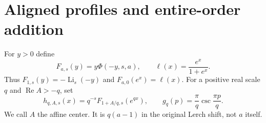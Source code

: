 \documentclass[11pt,a4paper]{article}
\numberwithin{equation}{section}
\theoremstyle{definition}\newtheorem{definition}[theorem]{Definition}
\theoremstyle{remark}\newtheorem{remark}[theorem]{Remark}
\DeclareMathOperator{\Li}{Li}
\DeclareMathOperator{\Rea}{Re}
\begin{document}
\section{Aligned profiles and entire-order addition}
\label{clc:sec:analysis}

For $y>0$ define
\begin{equation}\label{clc:eq:F}
 F_{a,s}(y)=y\Phi(-y,s,a),\qquad
 \ell(x)=\frac{e^x}{1+e^x}.
\end{equation}
Thus $F_{1,s}(y)=-\Li_s(-y)$ and $F_{a,0}(e^x)=\ell(x)$.
For a positive real scale $q$ and $\Rea A>-q$, set
\begin{equation}\label{clc:eq:h}
 h_{q,A,s}(x)=q^{-s}F_{1+A/q,s}(e^{qx}),\qquad
 g_q(p)=\frac{\pi}{q}\csc\frac{\pi p}{q}.
\end{equation}
We call $A$ the affine center. It is $q(a-1)$ in the original Lerch
shift, not $a$ itself.
\end{document}
